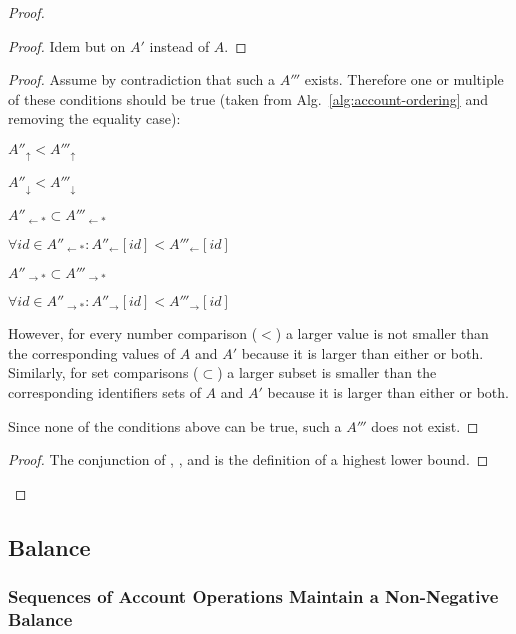\documentclass[9pt, oneside]{article}   	%
\begin{document}
\begin{proof}
	\begin{proof}
		Idem  but on $A'$ instead of $A$.
	\end{proof}
	
	\begin{proof}
		Assume by contradiction that such a $A'''$ exists. Therefore one or multiple of these conditions should be true (taken from Alg.~\ref{alg:account-ordering} and removing the equality case):
		\begin{pfenum}
			\item $A''_\uparrow < A'''_\uparrow$
			\item $A''_\downarrow < A'''_\downarrow$
			\item $A''_{\leftarrow *} \subset A'''_{\leftarrow *}$
			\item $\forall id \in A''_{\leftarrow *} : A''_{\leftarrow}[id] < A'''_{\leftarrow}[id] $
			\item $A''_{\rightarrow *} \subset A'''_{\rightarrow *}$  
			\item $\forall id \in A''_{\rightarrow *} : A''_{\rightarrow}[id] < A'''_{\rightarrow}[id] $
		\end{pfenum}
		However, for every number comparison ($<$) a larger value is not smaller than the corresponding values of $A$ and $A'$ because it is larger than either or both. Similarly, for set comparisons ($\subset$) a larger subset is smaller than the corresponding identifiers sets of $A$ and $A'$ because it is larger than either or both.
		
		Since none of the conditions above can be true, such a $A'''$ does not exist.
	\end{proof}
	
	\qedstep
	\begin{proof}
		The conjunction of , , and  is the definition of a highest lower bound.
	\end{proof}
\end{proof}



\subsection{Balance}
\label{sec:proof:balance}


\subsubsection{Sequences of Account Operations Maintain a Non-Negative Balance}
\label{section:proof:sequential-non-negative}
\end{document}
